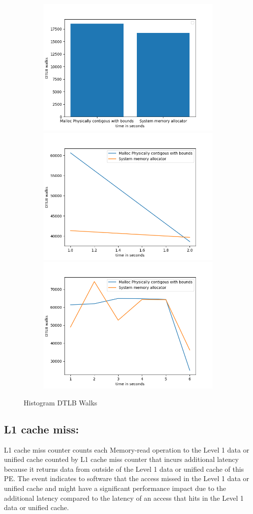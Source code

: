 \begin{figure}
  \begin{subfigure}{\linewidth}
    \includegraphics[width=.5\linewidth]{BenchmarkRuns/histogram/dtlb_walk_histogram_small.png}\hfill
    \includegraphics[width=.5\linewidth]{BenchmarkRuns/histogram/dtlb_walk_histogram_medium.png}\hfill
    \includegraphics[width=.5\linewidth]{BenchmarkRuns/histogram/dtlb_walk_histogram_large.png}
  \caption{}
  \end{subfigure}
  \caption{Histogram DTLB Walks}
\end{figure}

\subsection{L1 cache miss:}
L1 cache miss counter counts each Memory-read operation to the Level 1 data or unified cache counted by L1 cache miss counter that incurs additional latency because it returns data from outside of the Level 1 data or unified cache of this PE.
The event indicates to software that the access missed in the Level 1 data or unified cache and might have a significant performance impact due to the additional latency compared to the latency of an access that hits in the Level 1 data or unified cache.

